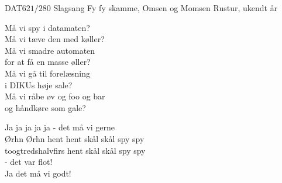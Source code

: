 \begin{song}{DAT62$1/2$80 Slagsang}
  {} %
  {Fy fy skamme, Omsen og Momsen} %
  {} %
  {Rustur, ukendt år} %
  {\NotCCLIed} %

  \begin{SBVerse}
    Må vi spy i datamaten?\\
    Må vi tæve den med køller?\\
    Må vi smadre automaten\\
    for at få en masse øller?\\
    Må vi gå til forelæsning\\
    i DIKUs høje sale?\\
    Må vi råbe øv og foo og bar\\
    og håndkøre som gale?
  \end{SBVerse}

  \begin{SBChorus}
    Ja ja ja ja ja - det må vi gerne\\
    Ørhn Ørhn hent hent skål skål spy spy\\
    toogtredshalvfirs hent skål skål spy spy\\
    - det var flot!\\
    \medskip
    Ja det må vi godt!
  \end{SBChorus}

  \begin{SBSection*}
  \end{SBSection*}
\end{song}
